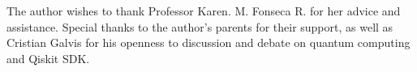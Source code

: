 The author wishes to thank Professor Karen. M. Fonseca R. for her advice and assistance. Special thanks to the author's parents for their support, as well as Cristian Galvis for his openness to discussion and debate on quantum computing and Qiskit SDK.
